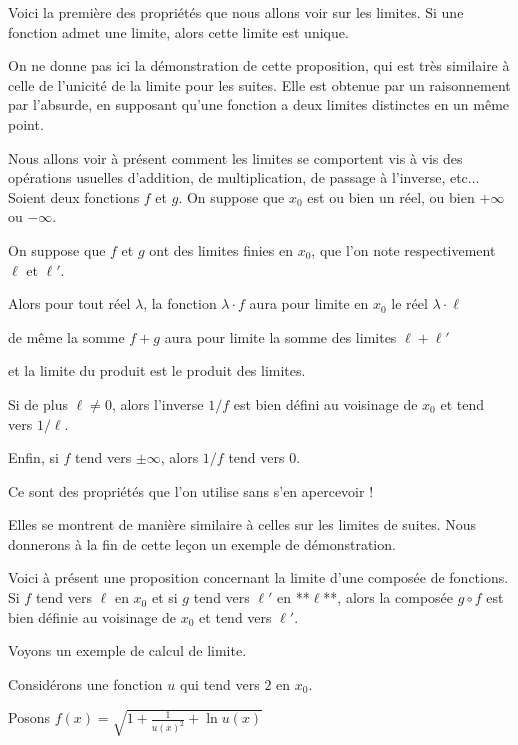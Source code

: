 Voici la première des propriétés que nous allons voir sur les limites. Si une fonction admet une limite, alors cette limite est unique.

On ne donne pas ici la démonstration de cette proposition, qui est très similaire à celle de 
l'unicité de la limite pour les suites. 
Elle est obtenue par un raisonnement par l'absurde, en supposant qu'une fonction a deux limites distinctes en un même point.


\diapo
Nous allons voir à présent comment les limites se comportent vis à vis 
des opérations usuelles d'addition, de multiplication, 
de passage à l'inverse, etc...  
Soient deux fonctions $f$ et $g$. 
On suppose que $x_0$ est ou bien un réel, ou bien $+\infty$ ou $-\infty$.

\change
On suppose que $f$ et $g$ ont des limites finies en $x_0$, que l'on note respectivement $\ell$ et $\ell'$.

\change
Alors pour tout réel $\lambda$, la fonction $\lambda\cdot f$ aura pour limite en $x_0$ le réel $\lambda\cdot \ell$

\change
de même la somme $f+g$ aura pour limite la somme des limites $\ell+\ell'$

\change
et la limite du produit est le produit des limites.

\change
Si de plus $\ell\neq 0$, alors l'inverse $1/f$ est bien défini au voisinage de $x_0$ et tend vers $1/\ell$.

\change
Enfin, si $f$ tend vers $\pm\infty$, alors $1/f$ tend vers $0$.


Ce sont des propriétés que l'on utilise sans s'en apercevoir !

Elles se montrent de manière similaire à celles sur les limites de suites. 
Nous donnerons à la fin de cette leçon un exemple de démonstration.


\diapo

Voici à présent une proposition concernant la limite d'une composée de fonctions. 
Si $f$ tend vers $\ell$ en $x_0$ et si $g$ tend vers $\ell'$ en **$\ell$**, 
alors la composée $g\circ f$ est bien définie au voisinage de $x_0$ et 
tend vers $\ell'$.


Voyons un exemple de calcul de limite. 

Considérons une fonction $u$ qui tend vers $2$ en $x_0$.

\change
Posons $f(x) = \sqrt{1+\frac{1}{u(x)^2}+\ln u(x)}$ 

